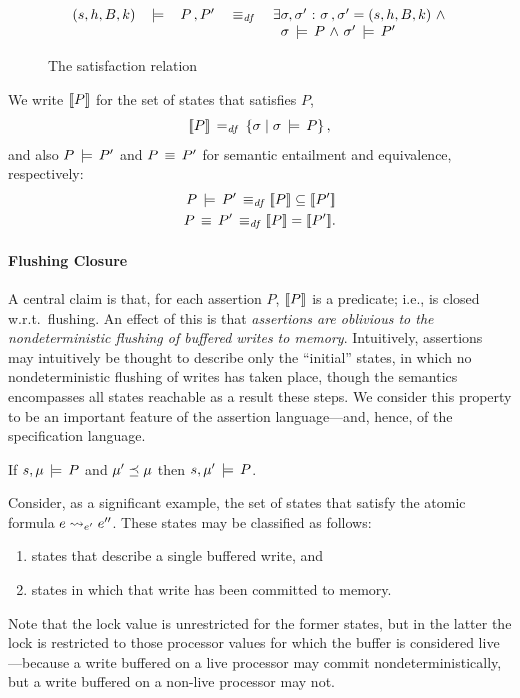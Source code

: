 \documentclass[11pt]{article}
\begin{document}
\begin{figure}[ht]
{\begin{minipage}{\columnwidth}
\[\begin{array}{llllll}
		(s,h,B,k) & \,\models\, & {P \operatorname{,} P'} & \operatorname{\;\equiv_{\mathit{df}}\;} & \exists \sigma,\sigma' \operatorname{\,:\,} \sigma \operatorname{,} \sigma' = (s,h,B,k) \operatorname{\,\wedge\,} \\ & & & & \;\;\sigma \,\models\,{P} \operatorname{\,\wedge\,} \sigma' \,\models\,{P'} \\
	\end{array}
	\]
\end{minipage}}
	\caption{\label{fig:satisfaction-relation} The satisfaction relation}
\end{figure}

We write $[\![P]\!]$ for the set of states that satisfies $P$,\[ [\![P]\!] \operatorname{\;=_{\mathit{df}}\;} \left\lbrace \sigma \mid \sigma \,\models\, P \right\rbrace,\] and also $P \,\models\, P'$ and $P \,\equiv\, P'$ for semantic entailment and equivalence, respectively: \begin{align*}
	P \sentails P' \iffdef \pred{P} \subseteq \pred{P'} \\
	P \sequiv P' \iffdef \pred{P} = \pred{P'}.
\end{align*} 

\paragraph{Flushing Closure}A central claim is that, for each assertion $P$, $[\![P]\!]$ is a predicate; i.e., is closed w.r.t.~flushing. An effect of this is that \emph{assertions are oblivious to the nondeterministic flushing of buffered writes to memory}. Intuitively, assertions may intuitively be thought to describe only the ``initial'' states, in which no nondeterministic flushing of writes has taken place, though the semantics encompasses all states reachable as a result these steps. We consider this property to be an important feature of the assertion language---and, hence, of the specification language. 

\begin{lemma}
	\label{lem:flushing-closure}
	If $s,\mu \,\models\, P$ and $\mu' \preceq \mu$ then $s,\mu' \,\models\, P$. 
\end{lemma}

Consider, as a significant example, the set of states that satisfy the atomic formula $e \leadsto_{e'} e''$. These states may be classified as follows: \begin{enumerate}
	\item states that describe a single buffered write, and 
	\item states in which that write has been committed to memory. 
\end{enumerate} Note that the lock value is unrestricted for the former states, but in the latter the lock is restricted to those processor values for which the buffer is considered live---because a write buffered on a live processor may commit nondeterministically, but a write buffered on a non-live processor may not. 
\end{document}
